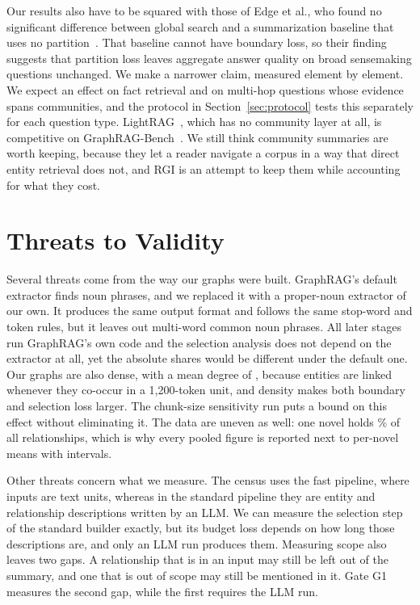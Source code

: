 \documentclass[journal]{IEEEtran}
\theoremstyle{remark}
\begin{document}
Our results also have to be squared with those of Edge et al., who found no significant difference between global search and a summarization baseline that uses no partition~\cite{edge2024graphrag}. That baseline cannot have boundary loss, so their finding suggests that partition loss leaves aggregate answer quality on broad sensemaking questions unchanged. We make a narrower claim, measured element by element. We expect an effect on fact retrieval and on multi-hop questions whose evidence spans communities, and the protocol in Section~\ref{sec:protocol} tests this separately for each question type. LightRAG~\cite{guo2024lightrag}, which has no community layer at all, is competitive on GraphRAG-Bench~\cite{xiang2026graphragbench}. We still think community summaries are worth keeping, because they let a reader navigate a corpus in a way that direct entity retrieval does not, and RGI is an attempt to keep them while accounting for what they cost.

\section{Threats to Validity}\label{sec:threats}

Several threats come from the way our graphs were built. GraphRAG's default extractor finds noun phrases, and we replaced it with a proper-noun extractor of our own. It produces the same output format and follows the same stop-word and token rules, but it leaves out multi-word common noun phrases. All later stages run GraphRAG's own code and the selection analysis does not depend on the extractor at all, yet the absolute shares would be different under the default one. Our graphs are also dense, with a mean degree of \MeanDegree, because entities are linked whenever they co-occur in a 1,200-token unit, and density makes both boundary and selection loss larger. The chunk-size sensitivity run puts a bound on this effect without eliminating it. The data are uneven as well: one novel holds \BigNovelShare\% of all relationships, which is why every pooled figure is reported next to per-novel means with intervals.

Other threats concern what we measure. The census uses the fast pipeline, where inputs are text units, whereas in the standard pipeline they are entity and relationship descriptions written by an LLM. We can measure the selection step of the standard builder exactly, but its budget loss depends on how long those descriptions are, and only an LLM run produces them. Measuring scope also leaves two gaps. A relationship that is in an input may still be left out of the summary, and one that is out of scope may still be mentioned in it. Gate G1 measures the second gap, while the first requires the LLM run.
\end{document}
